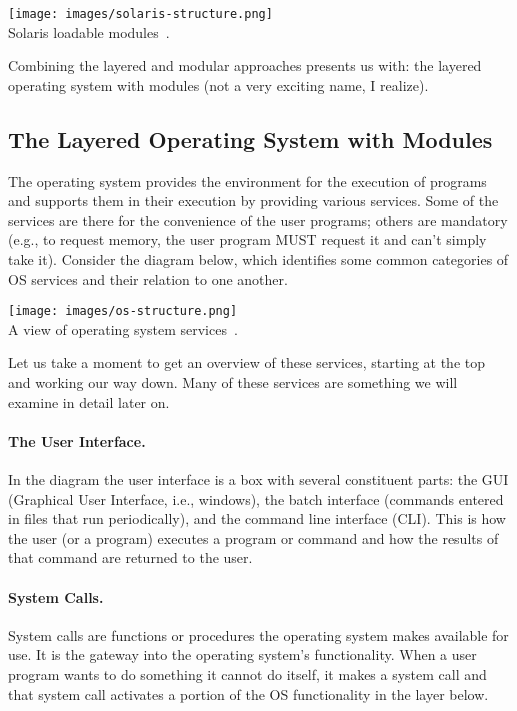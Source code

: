 \begin{center}
\texttt{[image: images/solaris-structure.png]}\\
Solaris loadable modules~\cite{osc}.
\end{center}

Combining the layered and modular approaches presents us with: the layered operating system with modules (not a very exciting name, I realize).

\subsection*{The Layered Operating System with Modules}

The operating system provides the environment for the execution of programs and supports them in their execution by providing various services. Some of the services are there for the convenience of the user programs; others are mandatory (e.g., to request memory, the user program MUST request it and can't simply take it). Consider the diagram below, which identifies some common categories of OS services and their relation to one another.

\begin{center}
\texttt{[image: images/os-structure.png]}\\
A view of operating system services~\cite{osc}.
\end{center}

Let us take a moment to get an overview of these services, starting at the top and working our way down. Many of these services are something we will examine in detail later on.

\paragraph{The User Interface.} In the diagram the user interface is a box with several constituent parts: the GUI (Graphical User Interface, i.e., windows), the batch interface (commands entered in files that run periodically), and the command line interface (CLI). This is how the user (or a program) executes a program or command and how the results of that command are returned to the user.

\paragraph{System Calls.} System calls are functions or procedures the operating system makes available for use. It is the gateway into the operating system's functionality. When a user program wants to do something it cannot do itself, it makes a system call and that system call activates a portion of the OS functionality in the layer below.


